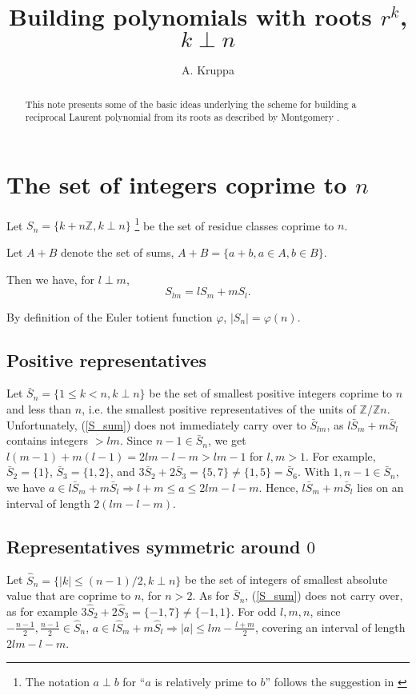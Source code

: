 \documentclass{article}
\begin{document}
\title{Building polynomials with roots $r^k$, $k\perp n$}
\author{A. Kruppa}
\maketitle


\begin{abstract}
This note presents some of the basic ideas underlying the scheme for building 
a reciprocal Laurent polynomial from its roots as described by Montgomery 
\cite{Montgomery2007}.
\end{abstract}


\section{The set of integers coprime to $n$}
Let $S_n = \{k + n\mathbb{Z}, k \perp n\}$
\footnote{The notation $a\perp b$ for ``$a$ is relatively prime to $b$''
          follows the suggestion in \cite[4.5]{Graham_Knuth_Patashnik}} 
be the set of residue classes coprime to $n$.

Let $A + B$ denote the set of sums, $A + B = \{a+b, a\in A, b\in B\}$.

Then we have, for $l \perp m$, 
\begin{equation}\label{S_sum}
S_{lm} = lS_m + mS_l.
\end{equation}

By definition of the Euler totient function $\varphi$, $|S_n| = \varphi(n)$.

\subsection{Positive representatives}
Let $\bar{S}_n = \{1 \leq k < n, k \perp n\}$ be the set of smallest 
positive integers coprime to $n$ and less than $n$, i.e. the smallest 
positive representatives of the units of $\mathbb{Z}/\mathbb{Z}n$. 
Unfortunately, (\ref{S_sum}) does not immediately carry over to 
$\bar{S}_{lm}$, as $l\bar{S}_m + m\bar{S}_l$ contains integers $> lm$.
Since $n-1 \in \bar{S}_n$, we get
$l(m-1) + m(l-1) = 2lm-l-m > lm-1$ for $l,m > 1$. For example, 
$\bar{S}_2 = \{1\}$, $\bar{S}_3 = \{1,2\}$, and 
$3\bar{S}_2 + 2\bar{S}_3 = \{5, 7\} \neq \{1, 5\} = \bar{S}_6$. With 
$1, n-1 \in \bar{S}_n$, we have 
$a \in l\bar{S}_m + m\bar{S}_l \Rightarrow l+m \leq a \leq 2lm - l - m$. 
Hence, $l\bar{S}_m + m\bar{S}_l$ lies on an interval of length 
$2(lm - l - m)$.

\subsection{Representatives symmetric around $0$}
Let $\hat{S}_n = \{|k| \leq (n-1)/2, k \perp n\}$ be the 
set of integers of smallest absolute value that are coprime to $n$, 
for $n > 2$. As for $\bar{S}_n$, (\ref{S_sum}) does not carry over, 
as for example $3\hat{S}_2 + 2\hat{S}_3 = \{-1,7\} \neq \{-1,1\}$.
For odd $l,m,n$, since $-\frac{n-1}{2},\frac{n-1}{2} \in \hat{S}_n$,
$a \in l\hat{S}_m + m\hat{S}_l \Rightarrow |a| \leq lm-\frac{l+m}{2}$, 
covering an interval of length $2lm - l - m$.
\end{document}
